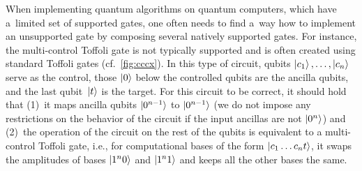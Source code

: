 When implementing quantum algorithms on quantum computers, which have a~limited
set of supported gates, one often needs to find a~way how to implement an
unsupported gate by composing several natively supported gates.
For instance, the multi-control Toffoli gate is not typically supported and
is often created using standard Toffoli gates (cf.~\cref{fig:cccx}).
In this type of circuit, qubits $\ket{c_1},\ldots,\ket{c_n}$ serve as the
control, those $\ket{0}$ below the controlled qubits are the ancilla qubits, and
the last qubit~$\ket t$ is the target. For this circuit to be correct, it should hold
that
(1)~it maps ancilla qubits $\ket{0^{n-1}}$ to $\ket{0^{n-1}}$ (we do not impose any
restrictions on the behavior of the circuit if the input ancillas are not
$\ket{0^n}$) and
(2)~the operation of the circuit on the rest of the qubits is equivalent to a
multi-control Toffoli gate, i.e.,
for computational bases of the form $\ket{c_1\ldots c_n t}$, it swaps the amplitudes of
bases $\ket{1^n 0}$ and $\ket{1^n1}$ and keeps all the other
bases the same.



